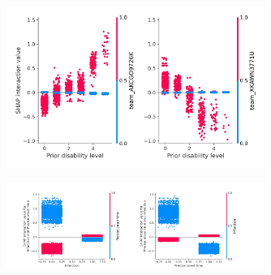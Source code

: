    \begin{figure}[!h]
    \centering
    \includegraphics[width=0.75\textwidth]{./images/12ac_disability_interaction_example}
    \caption{}
    \label{fig:results_8}
    \end{figure}
    
    
    \newpage
    
    \begin{figure}[!h]
    \centering
    \includegraphics[width=0.75\textwidth]{./images/shap_interaction_scatter_Infarction_Precise onset time}
    \caption{}
    \label{fig:results_10}
    \end{figure}
    
\fi

